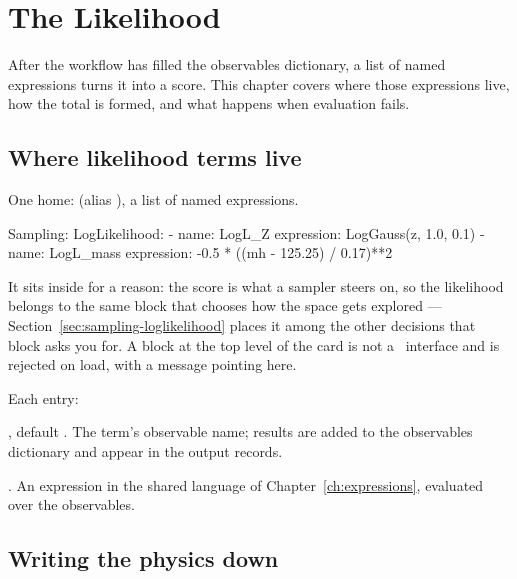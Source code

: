 \chapter{The Likelihood}
\label{ch:loglikelihood}

 After the workflow has filled the
observables dictionary, a list of named expressions turns it into a score. This chapter
covers where those expressions live, how the total  is formed, and what happens
when evaluation fails.

\section{Where likelihood terms live}
\label{sec:likelihood-blocks}

One home:  (alias ), a list of
named expressions.

\begin{yamlwin}
Sampling:
  LogLikelihood:
    - name: LogL_Z
      expression: LogGauss(z, 1.0, 0.1)
    - name: LogL_mass
      expression: -0.5 * ((mh - 125.25) / 0.17)**2
\end{yamlwin}

It sits inside  for a reason: the score is what a sampler steers on, so
the likelihood belongs to the same block that chooses how the space gets explored ---
Section~\ref{sec:sampling-loglikelihood} places it among the other decisions that block
asks you for. A  block at the top level of the card is not a \Jtwo\
interface and is rejected on load, with a message pointing here.

Each entry:

\begin{keylist}
  \item[name] \opt, default . The term's observable name; results are added
        to the observables dictionary and appear in the output records.
  \item[expression] \req. An expression in the shared language of
        Chapter~\ref{ch:expressions}, evaluated over the observables.
\end{keylist}

\section{Writing the physics down}
\label{sec:likelihood-physics}

